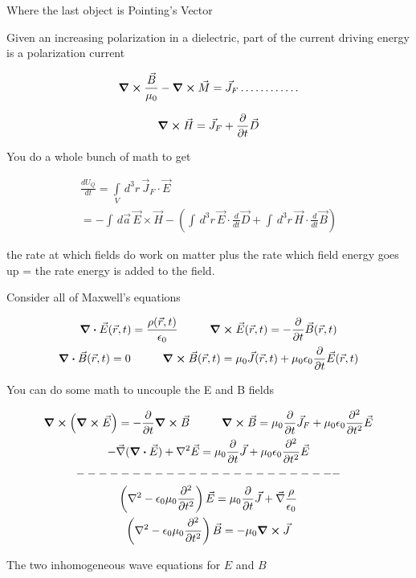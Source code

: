 \documentclass[fleqn]{report}
\newcommand{\hp}{\hspace{1cm}}
\newcommand{\del}{\partial}
\newcommand{\equations} [1] {
\begin{gather*}
#1
\end{gather*}
}
\begin{document}
Where the last object is Pointing's Vector 

Given an increasing polarization in a dielectric, part of the 
current driving energy is a polarization current 

\equations{
    \curl \frac{\vec B}{\mu_0}
    -
    \curl \vec M 
    =
    \vec J_F 
    \ldots 
    \ldots 
    \ldots 
    \ldots 
}


\equations{
    \curl \vec H 
    =
    \vec J_F 
    +
    \frac{\del}{\del t }
    \vec D 
}

You do a whole bunch of math to get 
\equations{
    \frac{dU_Q}{dt}
    =
    \int\limits_V \, d^3 r \, 
    \vec J_F \cdot \vec E 
    \\
    =
    - \int \, d \vec a \,
    \vec E \times \vec H
    -
    \left(
        \int \, d^3 r \, 
        \vec E \cdot \frac{d}{dt} \vec D 
        +
        \int \, d^3 r \, 
        \vec H \cdot \frac{d}{dt} \vec B 
    \right)
}

the rate at which fields do work on matter 
plus the rate which field energy goes up 
=
the rate energy is added to the field. 

Consider all of Maxwell's equations 
\equations{
    \div \vec E(\vec r, t) = \frac{\rho(\vec r, t)}{\epsilon_0}
    \hp 
    \curl \vec E(\vec r, t)
    =
    - \frac{\del}{\del t}
    \vec B(\vec r, t)
    \\
    \div \vec B(\vec r, t)
    =
    0
    \hp 
    \curl \vec B(\vec r, t)
    =
    \mu_0 \vec J(\vec r, t)
    +
    \mu_0 \epsilon_0 \frac{\del}{\del t}
    \vec E(\vec r, t)
}

You can do some math to uncouple the E and B fields 
\equations{
    \curl (\curl \vec E)
    = 
    - \frac{\del}{\del t} \curl \vec B 
    \hp 
    \curl \vec B 
    =
    \mu_0 \frac{\del}{\del t} \vec J_F 
    +
    \mu_0 \epsilon_0 \frac{\del^2}{\del t^2} \vec E 
    \\
    - \vec \nabla (\div \vec E )
    +
    \nabla^2 \vec E 
    =
    \mu_0 \frac{\del}{\del t}
    \vec J 
    +
    \mu_0 \epsilon_0 \frac{\del^2}{\del t^2} \vec E 
    \\
    ------------------------
    \\
    \left(\nabla^2 - \epsilon_0 \mu_0 \frac{\del^2}{\del t^2} \right)
    \vec E 
    =
    \mu_0 \frac{\del}{\del t}
    \vec J 
    +
    \vec \nabla \frac{\rho}{\epsilon_0}
    \\
    \left(\nabla^2 - \epsilon_0 \mu_0 \frac{\del^2}{\del t^2} \right)
    \vec B 
    =
    -
    \mu_0 
    \curl \vec J
}
The two inhomogeneous wave equations for $E$ and $B$
\end{document}
